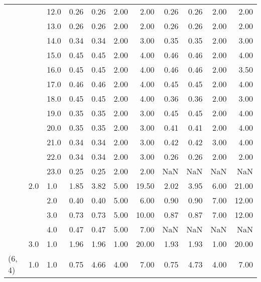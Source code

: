 \begin{tabular}{lllrrrrrrrr}
       &     & 12.0 &       0.26 &      0.26 & 2.00 &   2.00 &       0.26 &      0.26 & 2.00 &   2.00 \\
       &     & 13.0 &       0.26 &      0.26 & 2.00 &   2.00 &       0.26 &      0.26 & 2.00 &   2.00 \\
       &     & 14.0 &       0.34 &      0.34 & 2.00 &   3.00 &       0.35 &      0.35 & 2.00 &   3.00 \\
       &     & 15.0 &       0.45 &      0.45 & 2.00 &   4.00 &       0.46 &      0.46 & 2.00 &   4.00 \\
       &     & 16.0 &       0.45 &      0.45 & 2.00 &   4.00 &       0.46 &      0.46 & 2.00 &   3.50 \\
       &     & 17.0 &       0.46 &      0.46 & 2.00 &   4.00 &       0.45 &      0.45 & 2.00 &   4.00 \\
       &     & 18.0 &       0.45 &      0.45 & 2.00 &   4.00 &       0.36 &      0.36 & 2.00 &   3.00 \\
       &     & 19.0 &       0.35 &      0.35 & 2.00 &   3.00 &       0.45 &      0.45 & 2.00 &   4.00 \\
       &     & 20.0 &       0.35 &      0.35 & 2.00 &   3.00 &       0.41 &      0.41 & 2.00 &   4.00 \\
       &     & 21.0 &       0.34 &      0.34 & 2.00 &   3.00 &       0.42 &      0.42 & 3.00 &   4.00 \\
       &     & 22.0 &       0.34 &      0.34 & 2.00 &   3.00 &       0.26 &      0.26 & 2.00 &   2.00 \\
       &     & 23.0 &       0.25 &      0.25 & 2.00 &   2.00 &        NaN &       NaN &  NaN &    NaN \\
       & 2.0 & 1.0  &       1.85 &      3.82 & 5.00 &  19.50 &       2.02 &      3.95 & 6.00 &  21.00 \\
       &     & 2.0  &       0.40 &      0.40 & 5.00 &   6.00 &       0.90 &      0.90 & 7.00 &  12.00 \\
       &     & 3.0  &       0.73 &      0.73 & 5.00 &  10.00 &       0.87 &      0.87 & 7.00 &  12.00 \\
       &     & 4.0  &       0.47 &      0.47 & 5.00 &   7.00 &        NaN &       NaN &  NaN &    NaN \\
       & 3.0 & 1.0  &       1.96 &      1.96 & 1.00 &  20.00 &       1.93 &      1.93 & 1.00 &  20.00 \\
(6, 4) & 1.0 & 1.0  &       0.75 &      4.66 & 4.00 &   7.00 &       0.75 &      4.73 & 4.00 &   7.00 \\

\end{tabular}
